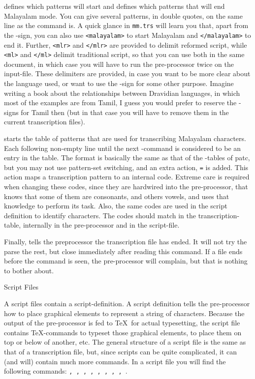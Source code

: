 {\tt\@atbegin} defines which patterns will start
and {\tt\@atend} defines which patterns that will end Malayalam mode.
You can give several patterns, in double quotes, on the same line as the
command is. A quick glance in {\tt mm.trs} will learn you that, apart
from the {\tt\dollar}-sign, you can also use
{\tt<{}malayalam>} to start Malayalam and {\tt<{}/malayalam>} to end it.
Further, {\tt<{}mlr>} and {\tt<{}/mlr>} are provided to
delimit reformed script, while {\tt<{}ml>} and
{\tt<{}/ml>} delimit traditional script, so that you can use both
in the same document, in which case you will have to run the pre-processor
twice on the input-file. These delimiters are provided, in case
you want to be more clear about the language used, or want to use the
{\tt\dollar}-sign for some other purpose. Imagine writing a book about
the relationships between Dravidian languages, in which most of the
examples are from Tamil, I guess you would prefer to reserve the
{\tt\dollar}-signs for Tamil then (but in that case you will have to
remove them in the current transcription files).

{\tt\@table} starts the table of patterns that are used for
transcribing Malayalam characters. Each following non-empty line until
the next {\tt\@}-command is considered to be an entry in the table. The
format is basically the same as that of the {\tt\@patterns}-tables of
patc, but you may not use pattern-set switching, and an extra action,
{\tt=} is added. This action maps a transcription pattern to an
internal code. Extreme care is required when changing these codes,
since they are hardwired into the pre-processor, that knows that some
of them are consonants, and others vowels, and uses that knowledge to
perform its task. Also, the same codes are used in the script
definition to identify characters. The codes should match in
the transcription-table, internally in the pre-processor and in the
script-file.

Finally, {\tt\@end} tells the preprocessor the transcription file has
ended. It will not try the parse the rest, but close immediately after
reading this command. If a file ends before the {\tt\@end} command is
seen, the pre-processor will complain, but that is nothing to bother
about.

\beginsection Script Files

A script files contain a script-definition. A script definition tells the
pre-processor how to place graphical elements to represent a string of
characters. Because the output of the pre-processor is fed to \TeX\
for actual typesetting, the script file contains \TeX-commands to
typeset those graphical elements, to place them on top or below of
another, etc. The general structure of a script file is the same as
that of a transcription file, but, since scripts can be quite
complicated, it can (and will) contain much more commands. In a script
file you will find the following commands: {\tt \@malayalam,
\@atbegin, \@atend, \@atbeginsyllabe, \@atendsyllabe, \@prebuild,
\@primary, \@secondary, \@reepham{\rm, and} \@end}.

